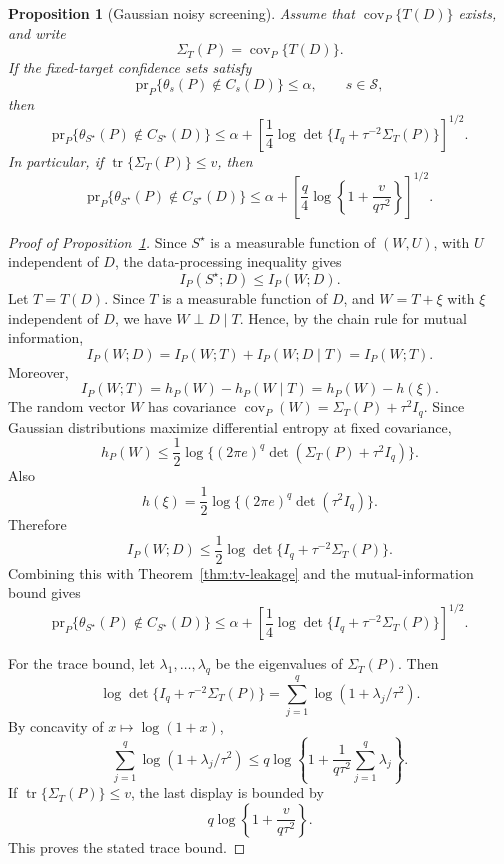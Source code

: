 \documentclass[10pt,a4paper]{amsart}
\newtheorem{proposition}{Proposition}
\newcommand{\calS}{\mathcal S}
\begin{document}
\begin{proposition}[Gaussian noisy screening]
	\label{prop:gaussian-noisy-screening}
	Assume that \(\operatorname{cov}_P\{T(D)\}\) exists, and write
	\[
	\Sigma_T(P)=\operatorname{cov}_P\{T(D)\}.
	\]
	If the fixed-target confidence sets satisfy
	\[
	\mathrm{pr}_P\{\theta_s(P)\notin C_s(D)\}\leq \alpha,
	\qquad s\in\calS ,
	\]
	then
	\[
	\mathrm{pr}_P\{\theta_{S^\star}(P)\notin C_{S^\star}(D)\}
	\leq
	\alpha+
	\left[
	\frac14
	\log\det\{I_q+\tau^{-2}\Sigma_T(P)\}
	\right]^{1/2}.
	\]
	In particular, if \(\operatorname{tr}\{\Sigma_T(P)\}\leq v\), then
	\[
	\mathrm{pr}_P\{\theta_{S^\star}(P)\notin C_{S^\star}(D)\}
	\leq
	\alpha+
	\left[
	\frac{q}{4}
	\log\left\{1+\frac{v}{q\tau^2}\right\}
	\right]^{1/2}.
	\]
\end{proposition}

\begin{proof}[Proof of Proposition~\ref{prop:gaussian-noisy-screening}]
	Since \(S^\star\) is a measurable function of \((W,U)\), with \(U\) independent of \(D\), the data-processing inequality gives
	\[
	I_P(S^\star;D)\leq I_P(W;D).
	\]
	Let \(T=T(D)\). Since \(T\) is a measurable function of \(D\), and
	\(W=T+\xi\) with \(\xi\) independent of \(D\), we have
	\(W\perp D\mid T\). Hence, by the chain rule for mutual information,
	\[
	I_P(W;D)
	=
	I_P(W;T)+I_P(W;D\mid T)
	=
	I_P(W;T).
	\]
	Moreover,
	\[
	I_P(W;T)
	=
	h_P(W)-h_P(W\mid T)
	=
	h_P(W)-h(\xi).
	\]
	The random vector \(W\) has covariance \(\operatorname{cov}_P(W)=\Sigma_T(P)+\tau^2 I_q.\)
	Since Gaussian distributions maximize differential entropy at fixed covariance,
	\[
	h_P(W)
	\leq
	\frac12\log\{(2\pi e)^q\det(\Sigma_T(P)+\tau^2 I_q)\}.
	\]
	Also
	\[
	h(\xi)
	=
	\frac12\log\{(2\pi e)^q\det(\tau^2 I_q)\}.
	\]
	Therefore
	\[
	I_P(W;D)
	\leq
	\frac12
	\log\det\{I_q+\tau^{-2}\Sigma_T(P)\}.
	\]
	Combining this with Theorem~\ref{thm:tv-leakage} and the mutual-information bound gives
	\[
	\mathrm{pr}_P\{\theta_{S^\star}(P)\notin C_{S^\star}(D)\}
	\leq
	\alpha+
	\left[
	\frac14
	\log\det\{I_q+\tau^{-2}\Sigma_T(P)\}
	\right]^{1/2}.
	\]
	
	For the trace bound, let \(\lambda_1,\ldots,\lambda_q\) be the eigenvalues of \(\Sigma_T(P)\). Then
	\[
	\log\det\{I_q+\tau^{-2}\Sigma_T(P)\}
	=
	\sum_{j=1}^q\log(1+\lambda_j/\tau^2).
	\]
	By concavity of \(x\mapsto\log(1+x)\),
	\[
	\sum_{j=1}^q\log(1+\lambda_j/\tau^2)
	\leq
	q\log\left\{
	1+\frac{1}{q\tau^2}\sum_{j=1}^q\lambda_j
	\right\}.
	\]
	If \(\operatorname{tr}\{\Sigma_T(P)\}\leq v\), the last display is bounded by
	\[
	q\log\left\{1+\frac{v}{q\tau^2}\right\}.
	\]
	This proves the stated trace bound.
\end{proof}
\end{document}
